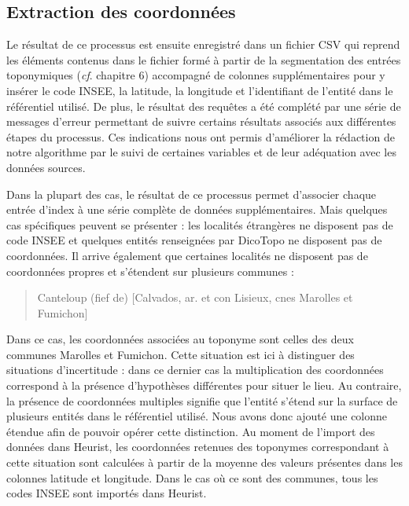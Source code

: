 \documentclass[a4paper,12pt,twoside]{book}
\begin{document}
	\subsection{Extraction des coordonnées}
	
	Le résultat de ce processus est ensuite enregistré dans un fichier CSV qui reprend les éléments contenus dans le fichier formé à partir de la segmentation des entrées toponymiques (\textit{cf}. chapitre 6) accompagné de colonnes supplémentaires pour y insérer le code INSEE, la latitude, la longitude et l'identifiant de l'entité dans le référentiel utilisé. De plus, le résultat des requêtes a été complété par une série de messages d'erreur permettant de suivre certains résultats associés aux différentes étapes du processus. Ces indications nous ont permis d'améliorer la rédaction de notre algorithme par le suivi de certaines variables et de leur adéquation avec les données sources.
	
	Dans la plupart des cas, le résultat de ce processus permet d'associer chaque entrée d'index à une série complète de données supplémentaires. Mais quelques cas spécifiques peuvent se présenter : les localités étrangères ne disposent pas de code INSEE et quelques entités renseignées par DicoTopo ne disposent pas de coordonnées. Il arrive également que certaines localités ne disposent pas de coordonnées propres et s'étendent sur plusieurs communes :
	
	\begin{quotation}
		Canteloup (fief de) [Calvados, ar. et con Lisieux, cnes Marolles et Fumichon]
	\end{quotation}

	Dans ce cas, les coordonnées associées au toponyme sont celles des deux communes Marolles et Fumichon. Cette situation est ici à distinguer des situations d'incertitude : dans ce dernier cas la multiplication des coordonnées correspond à la présence d'hypothèses différentes pour situer le lieu. Au contraire, la présence de coordonnées multiples signifie que l'entité s'étend sur la surface de plusieurs entités dans le référentiel utilisé. Nous avons donc ajouté une colonne \og étendue\fg{} afin de pouvoir opérer cette distinction. Au moment de l'import des données dans Heurist, les coordonnées retenues des toponymes correspondant à cette situation sont calculées à partir de la moyenne des valeurs présentes dans les colonnes \og latitude\fg{} et \og longitude\fg{}. Dans le cas où ce sont des communes, tous les codes INSEE sont importés dans Heurist.
	
\end{document}
